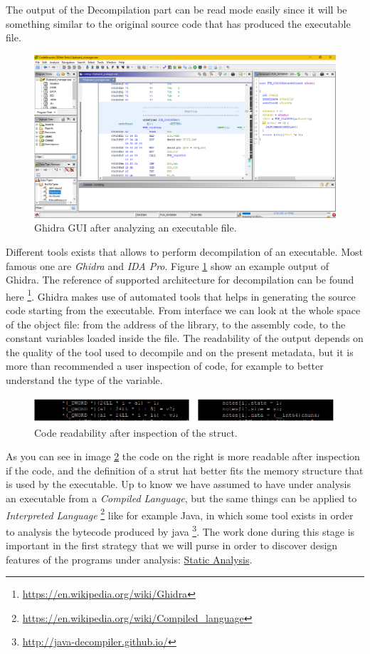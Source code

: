 \documentclass{article}
\begin{document}
The output of the Decompilation part can be read mode easily since it will be something similar to the original source code that has produced the executable file. 
\begin{figure}[htp]
    \centering
    \includegraphics[width=1\textwidth]{images/ghidra.png}
    \caption{Ghidra GUI after analyzing an executable file.}
    \label{fig:ghidraoutput}
\end{figure}
Different tools exists that allows to perform decompilation of an executable. Most famous one are \textit{Ghidra} and \textit{IDA Pro}. Figure \ref{fig:ghidraoutput} show an example output of Ghidra. The reference of supported architecture for decompilation can be found here \footnote{\url{https://en.wikipedia.org/wiki/Ghidra}}.
Ghidra makes use of automated tools that helps in generating the source code starting from the executable. From interface we can look at the whole space of the object file: from the address of the library, to the assembly code, to the constant variables loaded inside the file.
The readability of the output depends on the quality of the tool used to decompile and on the present metadata, but it is more than recommended a user inspection of code, for example to better understand the type of the variable.
\begin{figure}[htp]
    \centering
    \includegraphics[width=1\textwidth]{images/coderead.png}
    \caption{Code readability after inspection of the struct.}
    \label{fig:coderead}
\end{figure}
As you can see in image \ref{fig:coderead} the code on the right is more readable after inspection if the code, and the definition of a strut hat better fits the memory structure that is used by the executable.
Up to know we have assumed to have under analysis an executable from a \textit{Compiled Language}, but the same things can be applied to \textit{Interpreted Language} \footnote{\url{https://en.wikipedia.org/wiki/Compiled_language}} like for example Java, in which some tool exists in order to analysis the bytecode produced by java \footnote{\url{http://java-decompiler.github.io/}}.
The work done during this stage is important in the first strategy that we will purse in order to discover design features of the programs under analysis: \underline{Static Analysis}.
\end{document}
